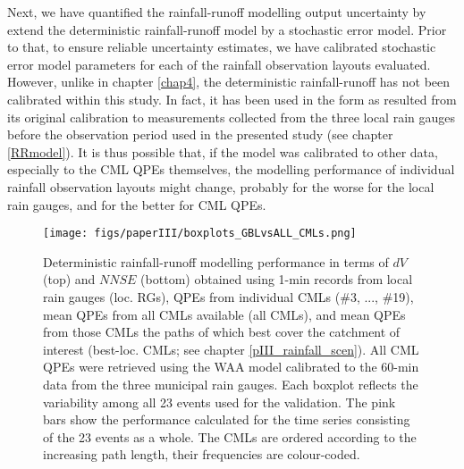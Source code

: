 \documentclass{ctuthesis}\usepackage[]{graphicx}\usepackage[]{color}
\begin{document}
Next, we have quantified the rainfall-runoff modelling output uncertainty by extend the deterministic rainfall-runoff model by a stochastic error model. Prior to that, to ensure reliable uncertainty estimates, we have calibrated stochastic error model parameters for each of the rainfall observation layouts evaluated. However, unlike in chapter \ref{chap4}, the deterministic rainfall-runoff has not been calibrated within this study. In fact, it has been used in the form as resulted from its original calibration to measurements collected from the three local rain gauges before the observation period used in the presented study (see chapter \ref{RRmodel}). It is thus possible that, if the model was calibrated to other data, especially to the CML QPEs themselves, the modelling performance of individual rainfall observation layouts might change, probably for the worse for the local rain gauges, and for the better for CML QPEs. %

\FloatBarrier

\begin{figure}[h]
\begin{center}
\texttt{[image: figs/paperIII/boxplots\_GBLvsALL\_CMLs.png]}
\caption{Deterministic rainfall-runoff modelling performance in terms of $dV$ (top) and $N\!N\!S\!E$ (bottom) obtained using 1-min records from local rain gauges (loc. RGs), QPEs from individual CMLs (\#3, ..., \#19), mean QPEs from all CMLs available (all CMLs), and mean QPEs from those CMLs the paths of which best cover the catchment of interest (best-loc. CMLs; see chapter \ref{pIII_rainfall_scen}). All CML QPEs were retrieved using the WAA model calibrated to the 60-min data from the three municipal rain gauges.  Each boxplot reflects the variability among all 23 events used for the validation. The pink bars show the performance calculated for the time series consisting of the 23 events as a whole. The CMLs are ordered according to the increasing path length, their frequencies are colour-coded.
} 
\label{fig:III_6}
\end{center}
\end{figure}

\FloatBarrier
\end{document}
